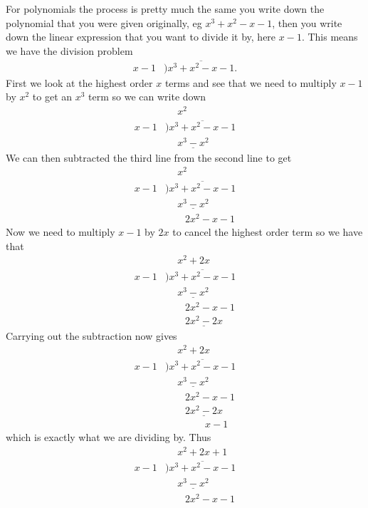 \begin{warpHTML}
For polynomials the process is pretty much the same you write down the polynomial that you were given originally, eg $x^{3}+x^{2}-x-1$, then you write down the linear expression that you want to divide it by, here $x-1$. This means we have the division problem
\begin{align*}
x-1&)\overline{x^{3}+x^{2}-x-1}.
\end{align*}
First we look at the highest order $x$ terms and see that we need to multiply $x-1$ by $x^2$ to get an $x^3$ term so we can write down
\begin{align*}
&\phantom{+}x^{2}\\
x-1&)\overline{x^{3}+x^{2}-x-1}\\
&\phantom{+}\underline{x^{3}-x^{2}}
\end{align*}
We can then subtracted the third line from the second line to get
\begin{align*}
&\phantom{+}x^{2}\\
x-1&)\overline{x^{3}+x^{2}-x-1}\\
&\phantom{+}\underline{x^{3}-x^{2}}\\
&\phantom{++}2x^{2}-x-1
\end{align*}
Now we need to multiply $x-1$ by $2x$ to cancel the highest order term so we have that
\begin{align*}
&\phantom{+}x^{2}+2x\\
x-1&)\overline{x^{3}+x^{2}-x-1}\\
&\phantom{+}\underline{x^{3}-x^{2}}\\
&\phantom{++}2x^{2}-x-1\\
&\phantom{++}\underline{2x^{2}-2x}
\end{align*}
Carrying out the subtraction now gives
\begin{align*}
&\phantom{+}x^{2}+2x\\
x-1&)\overline{x^{3}+x^{2}-x-1}\\
&\phantom{+}\underline{x^{3}-x^{2}}\\
&\phantom{++}2x^{2}-x-1\\
&\phantom{++}\underline{2x^{2}-2x}\\
&\phantom{++++}x-1
\end{align*}
which is exactly what we are dividing by. Thus
\begin{align*}
&\phantom{+}x^{2}+2x+1\\
x-1&)\overline{x^{3}+x^{2}-x-1}\\
&\phantom{+}\underline{x^{3}-x^{2}}\\
&\phantom{++}2x^{2}-x-1\\

\end{align*}
\end{warpHTML}

